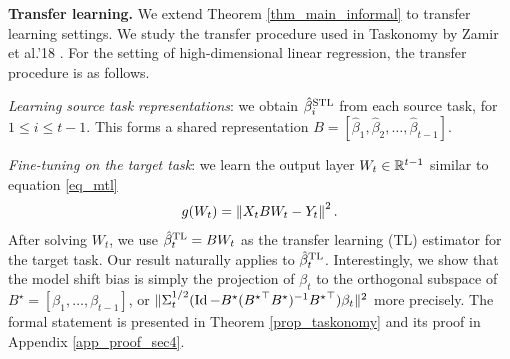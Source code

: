 \textbf{Transfer learning.}
We extend Theorem \ref{thm_main_informal} to transfer learning settings.
We study the transfer procedure used in Taskonomy by Zamir et al.'18 \cite{ZSSGM18}.
For the setting of high-dimensional linear regression, the transfer procedure is as follows.
\squishlist
	\item \textit{Learning source task representations}: we obtain $\hat{\beta}_i^{\text{STL}}$ from each source task, for $1\le i \le t-1$.
		This forms a shared representation ${B} = [\hat{\beta}_1,\hat{\beta}_2,\dots,\hat{\beta}_{t-1}]$.
	\item \textit{Fine-tuning on the target task}: we learn the output layer $W_t\in\mathbb{R}^{t-1}$ similar to equation \eqref{eq_mtl}
		\begin{align}
			g(W_t) = \left\| X_t B W_t - Y_t \right\|^2.
		\end{align}
\squishend
After solving $W_t$, we use $\hat{\beta}_t^{\text{TL}} = B W_t$ as the transfer learning (TL) estimator for the target task.
Our result naturally applies to $\hat{\beta}_t^{\text{TL}}$.
Interestingly, we show that the model shift bias is simply the projection of $\beta_t$ to the orthogonal subspace of $B^{\star} = [\beta_1,\dots,\beta_{t-1}]$, or $\|\Sigma_t^{1/2}(\operatorname{Id} - B^{\star}({B^{\star}}^{\top}B^{\star})^{-1}{B^{\star}}^{\top})\beta_t\|^2$ more precisely.
The formal statement is presented in Theorem \ref{prop_taskonomy} and its proof in Appendix \ref{app_proof_sec4}.






